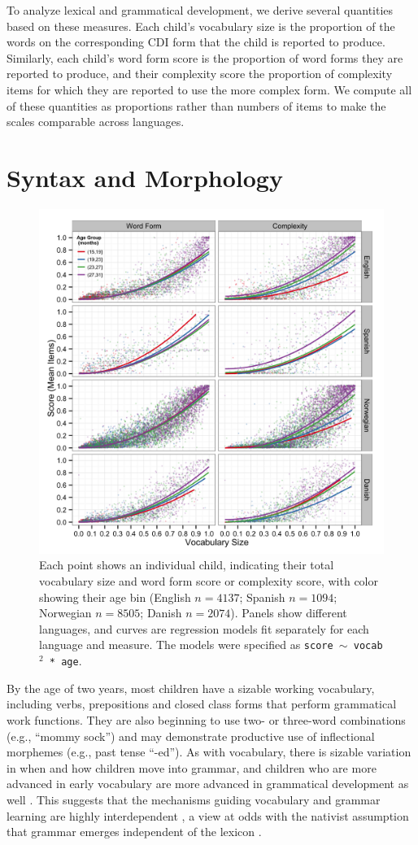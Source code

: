 \documentclass[10pt,letterpaper]{article}
\begin{document}
To analyze lexical and grammatical development, we derive several quantities based on these measures. Each child's vocabulary size is the proportion of the words on the corresponding CDI form that the child is reported to produce. Similarly, each child's word form score is the proportion of word forms they are reported to produce, and their complexity score the proportion of complexity items for which they are reported to use the more complex form. We compute all of these quantities as proportions rather than numbers of items to make the scales comparable across languages.

\section{Syntax and Morphology}

\begin{figure}[tbh]
\begin{center}
\includegraphics[width=.75\textwidth]{plots/grammar.png}
\end{center}
\caption{\label{fig:grammar} Each point shows an individual child, indicating their total vocabulary size and word form score or complexity score, with color showing their age bin (English $n=4137$; Spanish $n=1094$; Norwegian $n=8505$; Danish $n=2074$). Panels show different languages, and curves are regression models fit separately for each language and measure. The models were specified as \small{\tt{score $\sim$ vocab$^{2}$ * age}}.} 
\end{figure}

By the age of two years, most children have a sizable working vocabulary, including verbs, prepositions and closed class forms that perform grammatical work functions. They are also beginning to use two- or three-word combinations (e.g., ``mommy sock'') and may demonstrate productive use of inflectional morphemes (e.g., past tense ``-ed''). As with vocabulary, there is sizable variation in when and how children move into grammar, and children who are more advanced in early vocabulary are more advanced in grammatical development as well \cite{bates1999}. This suggests that the mechanisms guiding vocabulary and grammar learning are highly interdependent \cite{tomasello2003,bresnan2001}, a view at odds with the nativist assumption that grammar emerges independent of the lexicon \cite{chomsky1981}.
\end{document}

